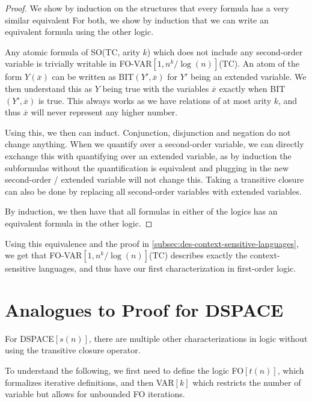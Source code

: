 \begin{proof}
    We show by induction on the structures that every formula has a very similar equivalent
    For both, we show by induction that we can write an equivalent formula using the other logic.

    Any atomic formula of SO(TC, arity $k$) which does not include any second-order variable is trivially writable in FO-VAR$[1, n^k/\log(n)]$(TC).
    An atom of the form $Y(\overline{x})$ can be written as BIT$(Y', \overline{x})$ for $Y'$ being an extended variable.
    We then understand this as $Y$ being true with the variables $\overline{x}$ exactly when BIT$(Y', \overline{x})$ is true.
    This always works as we have relations of at most arity $k$, and thus $\overline{x}$ will never represent any higher number.

    Using this, we then can induct.
    Conjunction, disjunction and negation do not change anything.
    When we quantify over a second-order variable, we can directly exchange this with quantifying over an extended variable, as by induction the subformulas without the quantification is equivalent and plugging in the new second-order / extended variable will not change this.
    Taking a transitive closure can also be done by replacing all second-order variables with extended variables.

    By induction, we then have that all formulas in either of the logics has an equivalent formula in the other logic.
\end{proof}

Using this equivalence and the proof in \cref{subsec:des-context-sensitive-languages}, we get that FO-VAR$[1, n^k/\log(n)]$(TC) describes exactly the context-sensitive languages, and thus have our first characterization in first-order logic.


\section{Analogues to Proof for DSPACE}\label{sec:analogues-to-proof-for-dspace}

For DSPACE$[s(n)]$, there are multiple other characterizations in logic without using the transitive closure operator.

To understand the following, we first need to define the logic FO$[t(n)]$, which formalizes iterative definitions, and then VAR$[k]$ which restricts the number of variable but allows for unbounded FO iterations.

